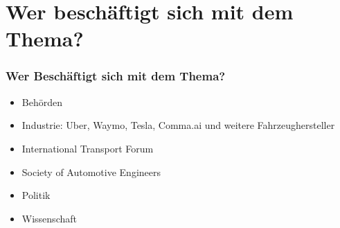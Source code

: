 \section{Wer beschäftigt sich mit dem Thema?}

\begin{frame}
    \frametitle{Wer Beschäftigt sich mit dem Thema?}

    \begin{itemize}
        \item Behörden \pause
        \item Industrie: Uber, Waymo, Tesla, Comma.ai und weitere Fahrzeughersteller \pause
        \item International Transport Forum \cite{websiteITF} \pause
        \item Society of Automotive Engineers \cite{websiteSAE} \pause
        \item Politik \pause
        \item Wissenschaft
    \end{itemize}
\end{frame}